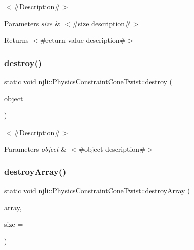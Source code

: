 $<$\#\+Description\#$>$


\begin{DoxyParams}{Parameters}
{\em size} & $<$\#size description\#$>$\\
\hline
\end{DoxyParams}
\begin{DoxyReturn}{Returns}
$<$\#return value description\#$>$ 
\end{DoxyReturn}
\mbox{\label{classnjli_1_1_physics_constraint_cone_twist_a4744a8d88fc827477a9ca1deb3781f4c}} 
\subsubsection{\texorpdfstring{destroy()}{destroy()}}
{\footnotesize\ttfamily static \mbox{\hyperlink{_thread_8h_af1e856da2e658414cb2456cb6f7ebc66}{void}} njli\+::\+Physics\+Constraint\+Cone\+Twist\+::destroy (\begin{DoxyParamCaption}\item[{\mbox{\hyperlink{classnjli_1_1_physics_constraint_cone_twist}{Physics\+Constraint\+Cone\+Twist}} $\ast$}]{object }\end{DoxyParamCaption})\hspace{0.3cm}{\ttfamily [static]}}

$<$\#\+Description\#$>$


\begin{DoxyParams}{Parameters}
{\em object} & $<$\#object description\#$>$ \\
\hline
\end{DoxyParams}
\mbox{\label{classnjli_1_1_physics_constraint_cone_twist_aa963148686e225ef41a5f101a4ae51c1}} 
\subsubsection{\texorpdfstring{destroy\+Array()}{destroyArray()}}
{\footnotesize\ttfamily static \mbox{\hyperlink{_thread_8h_af1e856da2e658414cb2456cb6f7ebc66}{void}} njli\+::\+Physics\+Constraint\+Cone\+Twist\+::destroy\+Array (\begin{DoxyParamCaption}\item[{\mbox{\hyperlink{classnjli_1_1_physics_constraint_cone_twist}{Physics\+Constraint\+Cone\+Twist}} $\ast$$\ast$}]{array,  }\item[{const \mbox{\hyperlink{_util_8h_a10e94b422ef0c20dcdec20d31a1f5049}{u32}}}]{size = {} }\end{DoxyParamCaption})\hspace{0.3cm}{\ttfamily [static]}}

